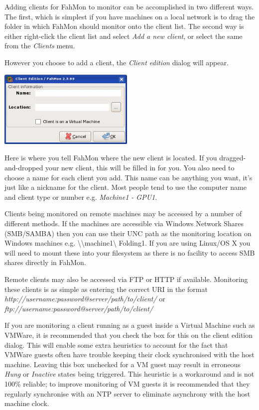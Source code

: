 Adding clients for FahMon to monitor can be accomplished in two different ways.
The first, which is simplest if you have machines on a local network is to drag
the folder in which FahMon should monitor onto the client list. The second way
is either right-click the client list and select \textit{Add a new client}, or
select the same from the \textit{Clients} menu.

However you choose to add a client, the \textit{Client edition} dialog will
appear.

\begin{center}
 \includegraphics[width=6.5cm]{5.png}
\end{center}


Here is where you tell FahMon where the new client is located. If you
dragged-and-dropped your new client, this will be filled in for you. You also
need to choose a name for each client you add. This name can be anything you
want, it's just like a nickname for the client. Most people tend to use the
computer name and client type or number e.g. \textit{Machine1 - GPU1}.

Clients being monitored on remote machines may be accessed by a number of
different methods. If the machines are accessible via Windows Network Shares
(SMB/SAMBA) then you can use their UNC path as the monitoring location on
Windows machines e.g. \textbackslash\textbackslash machine1\textbackslash
Folding1. If you are using Linux/OS X you will need to mount these into your
filesystem as there is no facility to access SMB shares directly in FahMon.

Remote clients may also be accessed via FTP or HTTP if available. Monitoring
these clients is as simple as entering the correct URI in the format
\textit{http://username:password@server/path/to/client/} or
\textit{ftp://username:password@server/path/to/client/}

If you are monitoring a client running as a guest inside a Virtual Machine such
as VMWare, it is recommended that you check the box for this on the client
edition dialog. This will enable some extra heuristics to account for the fact
that VMWare guests often have trouble keeping their clock synchronised with the
host machine. Leaving this box unchecked for a VM guest may result in erroneous
\textit{Hung} or \textit{Inactive} states being triggered. This heuristic is a
workaround and is not 100\% reliable; to improve monitoring of VM guests it is
recommended that they regularly synchronise with an NTP server to eliminate
asynchrony with the host machine clock.

